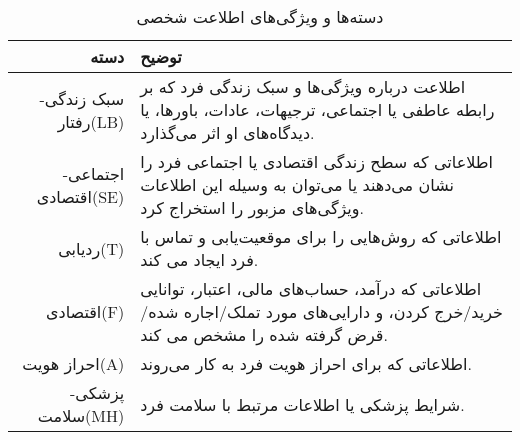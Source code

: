 	\begin{table}[ht]
		\caption{دسته‌ها و ویژگی‌های اطلاعت شخصی}
		\label{tab:PICatAndChar}
		\centering
		\onehalfspacing
		\begin{tabularx}{\linewidth}{ r X }
			دسته
			 &
			توضیح
			\\
			\hline
			سبک زندگی-رفتار(LB)
			 &
			اطلاعت درباره ویژگی‌ها و سبک زندگی فرد که بر رابطه عاطفی یا
			اجتماعی، ترجیهات، عادات، باورها، یا دیدگاه‌های او اثر می‌گذارد.
			\\
			اجتماعی-اقتصادی(SE)
			 &
			اطلاعاتی که سطح زندگی اقتصادی یا اجتماعی فرد را نشان می‌دهند یا
			می‌توان به وسیله این اطلاعات ویژگی‌های مزبور را استخراج کرد.
			\\
			ردیابی(T)
			 &
			اطلاعاتی که روش‌هایی را برای موقعیت‌یابی و تماس با فرد ایجاد می کند.
			\\
			اقتصادی(F)
			 &
			اطلاعاتی که درآمد، حساب‌های مالی، اعتبار، توانایی خرید/خرج کردن، و
			دارایی‌های مورد تملک/اجاره شده/قرض گرفته شده را مشخص می کند.
			\\
			احراز هویت(A)
			 &
			اطلاعاتی که برای احراز هویت فرد به کار می‌روند.
			\\
			پزشکی-سلامت(MH)
			 &
			شرایط پزشکی  یا اطلاعات مرتبط با سلامت فرد.
			\\
		\end{tabularx}
	\end{table}
